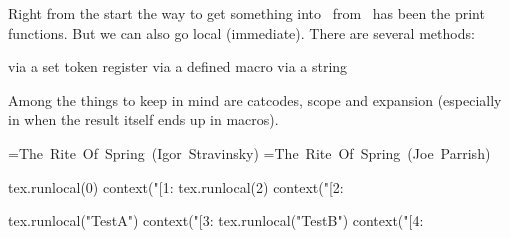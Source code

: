 \startbuffer[def]
\def\WidthOf#1%
  {\dimexpr
      \beginlocalcontrol
        \begingroup
          \setbox0\hbox{#1}%
          \expandafter
        \endgroup
      \expandafter
      \endlocalcontrol
      \the\wd0
   \relax}
\stopbuffer

\startbuffer[use]
\scratchdimen{}

\the\scratchdimen
\stopbuffer

\typebuffer[def]
\typebuffer[use]

\getbuffer[def]\getbuffer[use]

\stoptitle

\starttitle[title=The \LUA\ end]

Right from the start the way to get something into \TEX\ from \LUA\ has been the
print functions. But we can also go local (immediate). There are several methods:

\startitemize
\startitem via a set token register \stopitem
\startitem via a defined macro \stopitem
\startitem via a string \stopitem
\stopitemize

Among the things to keep in mind are catcodes, scope and expansion (especially in
when the result itself ends up in macros).

\stoptitle

\starttitle[title=Via a token register]


\startbuffer[set]
={\hbox{The Rite Of Spring (Igor Stravinsky)}}
={\hbox{The Rite Of Spring (Joe Parrish)}}
\stopbuffer

\typebuffer[set]

\startbuffer[run]
\startluacode
tex.runlocal(0) context("[1: %
tex.runlocal(2) context("[2: %
\stopluacode
\stopbuffer

\typebuffer[run]

\start {} \stop

\stoptitle

\starttitle[title=Via a token macro]

\startbuffer[set]
\def\TestB{\setbox0\hbox{The Rite Of Spring (Joe Parrish)}}
\stopbuffer

\typebuffer[set]

\startbuffer[run]
\startluacode
tex.runlocal("TestA") context("[3: %
tex.runlocal("TestB") context("[4: %
\stopluacode
\stopbuffer

